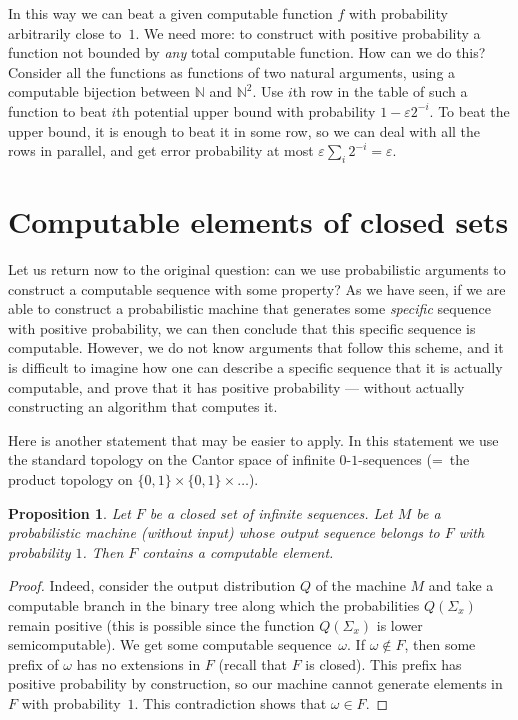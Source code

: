 \documentclass[12pt]{article}
\newtheorem{proposition}{Proposition}
\begin{document}
In this way we can beat a given computable function $f$ with probability arbitrarily close to~$1$. We need more: to construct with positive probability a function not bounded by \emph{any} total computable function. How can we do this? Consider all the functions as functions of two natural arguments, using a computable bijection between $\mathbb{N}$ and $\mathbb{N}^2$.  Use $i$th row  in the table of such a function to beat $i$th potential upper bound with probability $1-\varepsilon2^{-i}$. To beat the upper bound, it is enough to beat it in some row, so we can deal with all the rows in parallel, and get error probability at most $\varepsilon\sum_i 2^{-i}=\varepsilon$.

\section{Computable elements of closed sets}

Let us return now to the original question: can we use probabilistic arguments to construct a computable sequence with some property? As we have seen, if we are able to construct a probabilistic machine that generates some \emph{specific} sequence with positive probability, we can then conclude that this specific sequence is computable. However, we do not know arguments that follow this scheme, and it is difficult to imagine how one can describe a specific sequence that it is actually computable, and prove that it has positive probability --- without actually constructing an algorithm that computes it.

Here is another statement that may be easier to apply. In this statement we use the standard topology on the Cantor space of infinite $0$-$1$-sequences (=~the product topology on $\{0,1\}\times\{0,1\}\times\ldots$).

\begin{proposition}\label{closed-almost-everywhere}
Let $F$ be a closed set of infinite sequences. Let $M$ be a probabilistic machine \textup(without input\textup) whose output sequence belongs to $F$ with probability $1$. Then $F$ contains a computable element.
\end{proposition}

\begin{proof}
Indeed, consider the output distribution $Q$ of the machine $M$ and take a computable branch in the binary tree along which the probabilities $Q(\Sigma_x)$ remain positive (this is possible since the function $Q(\Sigma_x)$ is lower semicomputable). We get some computable sequence~$\omega$. If $\omega\notin F$, then some prefix of $\omega$ has no extensions in $F$ (recall that $F$ is closed). This prefix has positive probability by construction, so our machine cannot generate elements in $F$ with probability~$1$. This contradiction shows that $\omega\in F$.
\end{proof}
\end{document}
